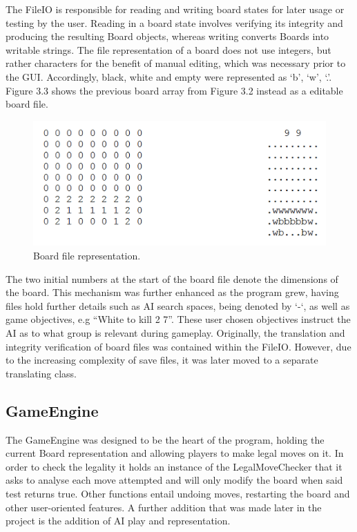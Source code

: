 \documentclass{l3proj}
\begin{document}
The FileIO is responsible for reading and writing board states for later usage or testing by the user. Reading in a board state involves verifying its integrity and producing the resulting Board objects, whereas writing converts Boards into writable strings. The file representation of a board does not use integers, but rather characters for the benefit of manual editing, which was necessary prior to the GUI. Accordingly, black, white and empty were represented as ‘b’, ‘w’, ‘.’. Figure 3.3 shows the previous board array from Figure 3.2 instead as a editable board file.

\begin{figure}[H]
\centering
\includegraphics[scale=1]{Images/GE-BoardSave.png}
\caption{Board file representation.}
\end{figure}

The two initial numbers at the start of the board file denote the dimensions of the board. This mechanism was further enhanced as the program grew, having files hold further details such as AI search spaces, being denoted by ‘-‘, as well as game objectives, e.g “White to kill 2 7”. These user chosen objectives instruct the AI as to what group is relevant during gameplay. Originally, the translation and integrity verification of board files was contained within the FileIO. However, due to the increasing complexity of save files, it was later moved to a separate translating class.

\subsection{GameEngine}

The GameEngine was designed to be the heart of the program, holding the current Board representation and allowing players to make legal moves on it. In order to check the legality it holds an instance of the LegalMoveChecker that it asks to analyse each move attempted and will only modify the board when said test returns true. Other functions entail undoing moves, restarting the board and other user-oriented features. A further addition that was made later in the project is the addition of AI play and representation. 
\end{document}

